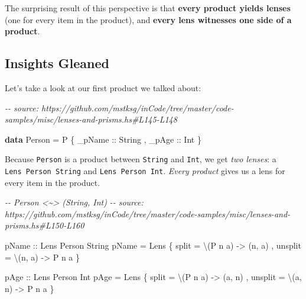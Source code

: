 \documentclass[]{article}
\newenvironment{Shaded}{}{}
\newcommand{\CommentTok}[1]{\textcolor[rgb]{0.38,0.63,0.69}{\textit{#1}}}
\newcommand{\DataTypeTok}[1]{\textcolor[rgb]{0.56,0.13,0.00}{#1}}
\newcommand{\KeywordTok}[1]{\textcolor[rgb]{0.00,0.44,0.13}{\textbf{#1}}}
\newcommand{\NormalTok}[1]{#1}
\newcommand{\OtherTok}[1]{\textcolor[rgb]{0.00,0.44,0.13}{#1}}
\begin{document}
The surprising result of this perspective is that \textbf{every product yields
lenses} (one for every item in the product), and \textbf{every lens witnesses
one side of a product}.

\subsection{Insights Gleaned}\label{insights-gleaned}

Let's take a look at our first product we talked about:

\begin{Shaded}
\begin{Highlighting}[]
\CommentTok{{-}{-} source: https://github.com/mstksg/inCode/tree/master/code{-}samples/misc/lenses{-}and{-}prisms.hs\#L145{-}L148}

\KeywordTok{data} \DataTypeTok{Person} \OtherTok{=} \DataTypeTok{P}
\NormalTok{    \{}\OtherTok{ \_pName ::} \DataTypeTok{String}
\NormalTok{    ,}\OtherTok{ \_pAge  ::} \DataTypeTok{Int}
\NormalTok{    \}}
\end{Highlighting}
\end{Shaded}

Because \texttt{Person} is a product between \texttt{String} and \texttt{Int},
we get \emph{two lenses}: a \texttt{Lens\textquotesingle{}\ Person\ String} and
\texttt{Lens\textquotesingle{}\ Person\ Int}. \emph{Every product} gives us a
lens for every item in the product.

\begin{Shaded}
\begin{Highlighting}[]
\CommentTok{{-}{-} Person \textless{}\textasciitilde{}\textgreater{} (String, Int)}
\CommentTok{{-}{-} source: https://github.com/mstksg/inCode/tree/master/code{-}samples/misc/lenses{-}and{-}prisms.hs\#L150{-}L160}

\OtherTok{pName ::} \DataTypeTok{Lens\textquotesingle{}} \DataTypeTok{Person} \DataTypeTok{String}
\NormalTok{pName }\OtherTok{=} \DataTypeTok{Lens\textquotesingle{}}
\NormalTok{    \{ split   }\OtherTok{=}\NormalTok{ \textbackslash{}(}\DataTypeTok{P}\NormalTok{ n a) }\OtherTok{{-}\textgreater{}}\NormalTok{ (n, a)}
\NormalTok{    , unsplit }\OtherTok{=}\NormalTok{ \textbackslash{}(n, a)  }\OtherTok{{-}\textgreater{}} \DataTypeTok{P}\NormalTok{ n a}
\NormalTok{    \}}

\OtherTok{pAge ::} \DataTypeTok{Lens\textquotesingle{}} \DataTypeTok{Person} \DataTypeTok{Int}
\NormalTok{pAge }\OtherTok{=} \DataTypeTok{Lens\textquotesingle{}}
\NormalTok{    \{ split   }\OtherTok{=}\NormalTok{ \textbackslash{}(}\DataTypeTok{P}\NormalTok{ n a) }\OtherTok{{-}\textgreater{}}\NormalTok{ (a, n)}
\NormalTok{    , unsplit }\OtherTok{=}\NormalTok{ \textbackslash{}(a, n)  }\OtherTok{{-}\textgreater{}} \DataTypeTok{P}\NormalTok{ n a}
\NormalTok{    \}}
\end{Highlighting}
\end{Shaded}
\end{document}
